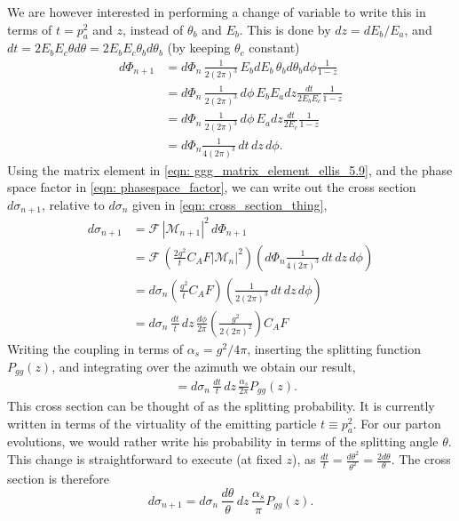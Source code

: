 \documentclass[main.tex]{subfiles}
\begin{document}
We are however interested in performing a change of variable to write this in terms of \(t=p_a^2\) and \(z\), instead of \(\theta_b\) and \(E_b\). This is done by \(dz = dE_b /E_a\), and \(dt = 2 E_b E_c \theta d\theta = 2 E_b E_c \theta_b d\theta_b\) (by keeping \(\theta_c\) constant)
\begin{align}\label{eqn: phasespace_factor}
    d\Phi_{n+1} &= d\Phi_n \,\frac{1}{2(2\pi)^3} \, E_b dE_b \, \theta_b d\theta_b d\phi  \frac{1}{1-z}  \nonumber \\
    &= d\Phi_n \,\frac{1}{2(2\pi)^3} \,d\phi \, E_b E_a dz  \frac{dt}{2E_bE_c} \frac{1}{1-z} \nonumber \\
    &= d\Phi_n \,\frac{1}{2(2\pi)^3} \,d\phi \, E_a dz \frac{dt}{2E_c} \frac{1}{1-z} \nonumber \\
    &= d\Phi_n \frac{1}{4 (2\pi)^3} \, dt\, dz \, d\phi .
\end{align}
Using the matrix element in \autoref{eqn: ggg_matrix_element_ellis_5.9}, and the phase space factor in \autoref{eqn: phasespace_factor}, we can write out the cross section \(d\sigma_{n+1}\), relative to \(d\sigma_n\) given in \autoref{eqn: cross_section_thing},
\begin{align}
    d\sigma_{n+1} &= \mathcal{F} \,|\mathcal{M}_{n+1}|^2 \,d\Phi_{n+1} \nonumber\\
    &= \mathcal{F} \,\left( \frac{2g^2}{t} C_AF|\mathcal{M}_n|^2 \right) \left( d\Phi_n \frac{1}{4 (2\pi)^3} \, dt\, dz \, d\phi  \right) \nonumber \\
    &= d\sigma_n  \left( \frac{g^2}{t} C_AF\right) \left( \frac{1}{2 (2\pi)^3} \, dt\, dz \, d\phi  \right) \nonumber \\
    &= d\sigma_n \, \frac{dt}{t}\, dz \, \frac{d\phi}{2\pi} \left( \frac{g^2}{2(2\pi)^2} \right) C_AF 
\end{align}
Writing the coupling in terms of \(\alpha_s=g^2/4\pi\), inserting the splitting function \(P_{gg}(z)\), and integrating over the azimuth we obtain our result,
\begin{align}
    &= d\sigma_n \, \frac{dt}{t}\, dz \, \frac{\alpha_s }{2\pi}  P_{gg}(z).
\end{align}
This cross section can be thought of as the splitting probability. It is currently written in terms of the virtuality of the emitting particle \(t \equiv p_a^2\). For our parton evolutions, we would rather write his probability in terms of the splitting angle \(\theta\). This change is straightforward to execute (at fixed \(z\)), as \(\frac{dt}{t} = \frac{d\theta^2}{\theta^2} = \frac{2 d\theta}{\theta} \). The cross section is therefore
\begin{equation}\label{eqn: branching_cross_section}
    d\sigma_{n+1}= d\sigma_n \, \frac{d\theta}{\theta}\, dz \, \frac{\alpha_s }{\pi} P_{gg}(z).
\end{equation}
\end{document}
